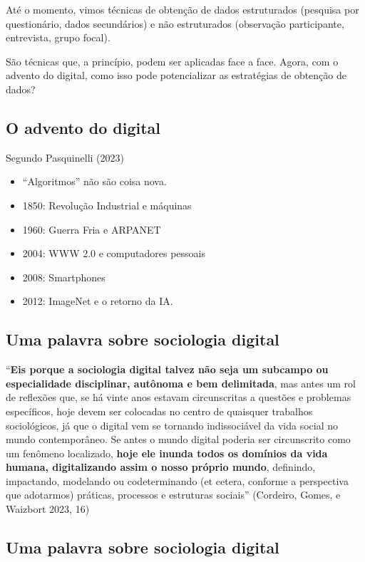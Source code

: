 \documentclass[
  brazilian,
  letterpaper,
  DIV=11,
  numbers=noendperiod]{scrartcl}
\providecommand{\tightlist}{%
  \setlength{\itemsep}{0pt}\setlength{\parskip}{0pt}}
\begin{document}
Até o momento, vimos técnicas de obtenção de dados estruturados
(pesquisa por questionário, dados secundários) e não estruturados
(observação participante, entrevista, grupo focal).

São técnicas que, a princípio, podem ser aplicadas face a face. Agora,
com o advento do digital, como isso pode potencializar as estratégias de
obtenção de dados?

\subsection{O advento do digital}\label{o-advento-do-digital}

Segundo Pasquinelli (2023)

\begin{itemize}
\tightlist
\item
  ``Algoritmos'' não são coisa nova.
\item
  1850: Revolução Industrial e máquinas
\item
  1960: Guerra Fria e ARPANET
\item
  2004: WWW 2.0 e computadores pessoais
\item
  2008: Smartphones
\item
  2012: ImageNet e o retorno da IA.
\end{itemize}

\subsection{Uma palavra sobre sociologia
digital}\label{uma-palavra-sobre-sociologia-digital}

{``\textbf{Eis porque a sociologia digital talvez não seja um subcampo
ou especialidade disciplinar, autônoma e bem delimitada}, mas antes um
rol de reflexões que, se há vinte anos estavam circunscritas a questões
e problemas específicos, hoje devem ser colocadas no centro de quaisquer
trabalhos sociológicos, já que o digital vem se tornando indissociável
da vida social no mundo contemporâneo. Se antes o mundo digital poderia
ser circunscrito como um fenômeno localizado, \textbf{hoje ele inunda
todos os domínios da vida humana, digitalizando assim o nosso próprio
mundo}, definindo, impactando, modelando ou codeterminando (et cetera,
conforme a perspectiva que adotarmos) práticas, processos e estruturas
sociais'' (Cordeiro, Gomes, e Waizbort 2023, 16)}

\subsection{Uma palavra sobre sociologia
digital}\label{uma-palavra-sobre-sociologia-digital-1}
\end{document}
